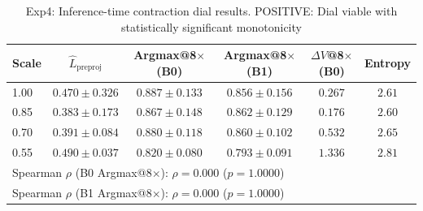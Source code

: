 \begin{table}[t]
\centering
\caption{Exp4: Inference-time contraction dial results. POSITIVE: Dial viable with statistically significant monotonicity}
\label{tab:exp4-dial}
\begin{tabular}{lccccc}
\toprule
Scale & $\hat{L}_{\text{preproj}}$ & Argmax@8$\times$ (B0) & Argmax@8$\times$ (B1) & $\Delta V$@8$\times$ (B0) & Entropy \\
\midrule
1.00 & $0.470 \pm 0.326$ & $0.887 \pm 0.133$ & $0.856 \pm 0.156$ & $0.267$ & $2.61$ \\
0.85 & $0.383 \pm 0.173$ & $0.867 \pm 0.148$ & $0.862 \pm 0.129$ & $0.176$ & $2.60$ \\
0.70 & $0.391 \pm 0.084$ & $0.880 \pm 0.118$ & $0.860 \pm 0.102$ & $0.532$ & $2.65$ \\
0.55 & $0.490 \pm 0.037$ & $0.820 \pm 0.080$ & $0.793 \pm 0.091$ & $1.336$ & $2.81$ \\
\midrule
\multicolumn{6}{l}{\small Spearman $\rho$ (B0 Argmax@8$\times$): $\rho=0.000$ ($p=1.0000$)} \\
\multicolumn{6}{l}{\small Spearman $\rho$ (B1 Argmax@8$\times$): $\rho=0.000$ ($p=1.0000$)} \\
\bottomrule
\end{tabular}
\end{table}
